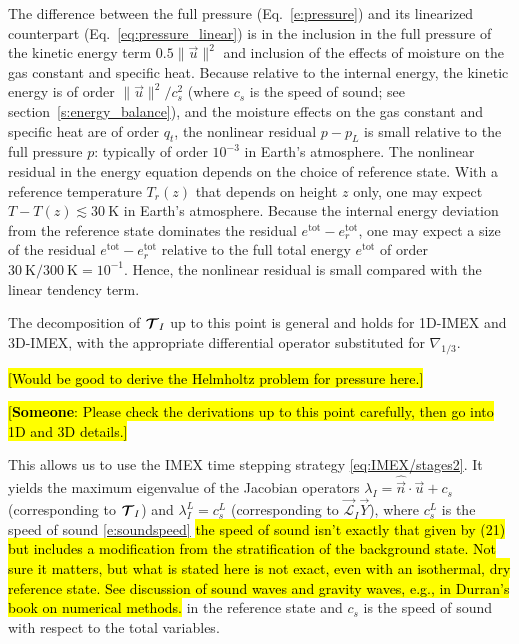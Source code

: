 \documentclass{report}
\begin{document}
{The difference between the full pressure (Eq.~\ref{e:pressure}) and its linearized counterpart (Eq.~\ref{eq:pressure_linear}) is in the inclusion in the full pressure of the kinetic energy term $0.5 \|\vec{u} \|^2$ and inclusion of the effects of moisture on the gas constant and specific heat. Because relative to the internal energy, the kinetic energy is of order $\|\vec{u}\|^2/c_s^2$ (where $c_s$ is the speed of sound; see section~\ref{s:energy_balance}), and the moisture effects on the gas constant and specific heat are of order $q_t$, the nonlinear residual $p-p_L$ is small relative to the full pressure $p$: typically of order $10^{-3}$ in Earth's atmosphere. The nonlinear residual in the energy equation depends on the choice of reference state. With a reference temperature $T_r(z)$ that depends on height $z$ only, one may expect $T - T(z) \lesssim 30~\mathrm{K}$ in Earth's atmosphere. Because the internal energy deviation from the reference state dominates the residual $e^{\mathrm{tot}} - e^{\mathrm{tot}}_r$, one may expect a size of the residual $e^{\mathrm{tot}} - e^{\mathrm{tot}}_r$ relative to the full total energy $e^{\mathrm{tot}}$ of order $30~\mathrm{K}/300~\mathrm{K} = 10^{-1}$. Hence, the nonlinear residual is small compared with the linear tendency term.
 
The decomposition of $\boldsymbol{{\mathcal{T}}}_I$ up to this point is general and holds for 1D-IMEX and 3D-IMEX, with the appropriate differential operator substituted for $\nabla_{1/3}$.

\hl{[Would be good to derive the Helmholtz problem for pressure here.]}

\hl{[\textbf{Someone}: Please check the derivations up to this point carefully, then go into 1D and 3D details.]}

This allows us to use the IMEX time stepping strategy \eqref{eq:IMEX/stages2}. It yields the maximum eigenvalue of the Jacobian operators  $\lambda_{I}=\widehat{\vec{n}} \cdot \vec{u} + c_{s}$ (corresponding to $\boldsymbol{{\mathcal{T}}}_{I}$) and  $\lambda^L_{I} = c^L_s$ (corresponding to $\vec{\mathcal{L}}_{I}\vec{Y}$), where $c^L_s$ is the speed of sound \eqref{e:soundspeed} \hl{the speed of sound isn't exactly that given by (21) but includes a modification from the stratification of the background state. Not sure it matters, but what is stated here is not exact, even with an isothermal, dry reference state. See discussion of sound waves and gravity waves, e.g., in Durran's book on numerical methods.} in the reference state and $c_s$ is the speed of sound with respect to the total variables. 
 
}
\end{document}
